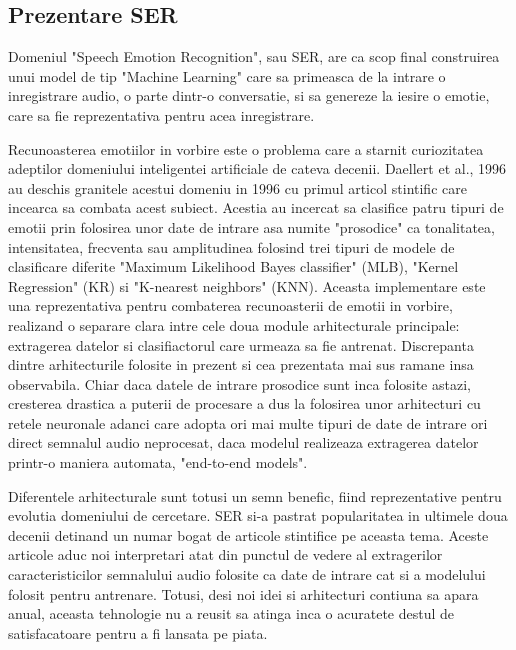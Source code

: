 \documentclass[a4paper,12pt]{book}
\begin{document}
			\subsection{Prezentare SER}
				Domeniul "Speech Emotion Recognition", sau SER, are ca scop final construirea unui model de tip "Machine Learning" care sa primeasca de la intrare o inregistrare audio, o parte dintr-o conversatie, si sa genereze la iesire o emotie, care sa fie reprezentativa pentru acea inregistrare. \par
				Recunoasterea emotiilor in vorbire este o problema care a starnit curiozitatea adeptilor domeniului inteligentei artificiale de cateva decenii. Daellert et al., 1996 \cite{dellaert} au deschis granitele acestui domeniu in 1996 cu primul articol stintific care incearca sa combata acest subiect. Acestia au incercat sa clasifice patru tipuri de emotii prin folosirea unor date de intrare asa numite "prosodice" ca tonalitatea, intensitatea, frecventa sau amplitudinea folosind trei tipuri de modele de clasificare diferite "Maximum Likelihood Bayes classifier" (MLB), "Kernel Regression"  (KR) si "K-nearest neighbors" (KNN). Aceasta implementare este una reprezentativa pentru combaterea recunoasterii de emotii in vorbire, realizand o separare clara intre cele doua module arhitecturale principale: extragerea datelor si clasifiactorul care urmeaza sa fie antrenat. Discrepanta dintre arhitecturile folosite in prezent si cea prezentata mai sus ramane insa observabila. Chiar daca datele de intrare prosodice sunt inca folosite astazi, cresterea drastica a puterii de procesare a dus la folosirea unor arhitecturi cu retele neuronale adanci care adopta ori mai multe tipuri de date de intrare ori direct semnalul audio neprocesat, daca modelul realizeaza extragerea datelor printr-o maniera automata, "end-to-end models". \par		
				
				Diferentele arhitecturale sunt totusi un semn benefic, fiind reprezentative pentru evolutia domeniului de cercetare. SER si-a pastrat popularitatea in ultimele doua decenii detinand un numar bogat de articole stintifice pe aceasta tema. Aceste articole aduc noi interpretari atat din punctul de vedere al extragerilor caracteristicilor semnalului audio folosite ca date de intrare cat si a modelului folosit pentru antrenare. Totusi, desi noi idei si arhitecturi contiuna sa apara anual, aceasta tehnologie nu a reusit sa atinga inca o acuratete destul de satisfacatoare pentru a fi lansata pe piata. \par
					
\end{document}
